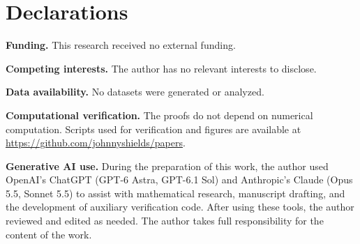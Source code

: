 \documentclass[11pt,a4paper]{amsart}
\numberwithin{equation}{section}
\theoremstyle{plain}
\theoremstyle{definition}
\begin{document}
\section*{Declarations}
{\footnotesize
\noindent\textbf{Funding.} This research received no external funding.

\smallskip
\noindent\textbf{Competing interests.} The author has no relevant interests to disclose.

\smallskip
\noindent\textbf{Data availability.} No datasets were generated or analyzed.

\smallskip
\noindent\textbf{Computational verification.} The proofs do not depend on numerical computation.  Scripts used for verification and figures are available at \url{https://github.com/johnnyshields/papers}.

\smallskip
\noindent\textbf{Generative AI use.} During the preparation of this work, the author used OpenAI's ChatGPT (GPT-6 Astra, GPT-6.1 Sol) and Anthropic's Claude (Opus 5.5, Sonnet 5.5) to assist with mathematical research, manuscript drafting, and the development of auxiliary verification code.  After using these tools, the author reviewed and edited as needed.  The author takes full responsibility for the content of the work.\par}
\end{document}
